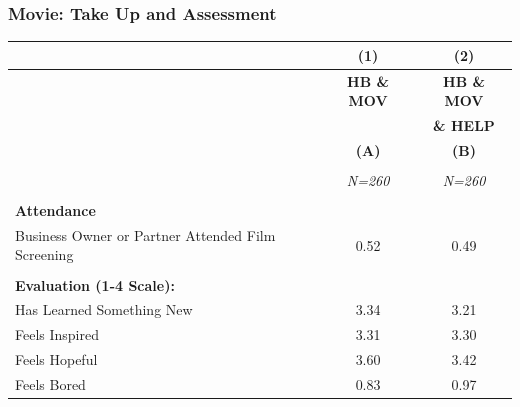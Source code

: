 \documentclass[10pt]{beamer}
\begin{document}
\begin{frame}
\frametitle{Movie: Take Up and Assessment}
{\scriptsize{\begin{table}[htbp]
  \centering
    \begin{tabular}{lcc}
    \hline
   	& (1)   					&(2)   						 \\
    \hline
  	& \textbf{HB \& MOV} 		& \textbf{HB \& MOV}		  \\
  	& 							& \textbf{\& HELP}			\\
   	& \textbf{(A)}   			& \textbf{(B)}   			 \\
 	&							&							\\
   	& \textit{N=260} 			& \textit{N=260} 			 \\
   \hline
   														&		&		 \\
    \textbf{Attendance} 								&       &         \\
    Business Owner or Partner Attended Film Screening 	& 0.52  & 0.49   \\
	&       &       \\
    \textbf{Evaluation (1-4 Scale):}	&       &        \\
    Has Learned Something New	& 3.34  & 3.21  \\
    Feels Inspired 				& 3.31  & 3.30   \\
    Feels Hopeful 				& 3.60  & 3.42   \\
    Feels Bored 				& 0.83  & 0.97    \\
    \end{tabular}

\end{table}}}

\end{frame}
\end{document}

